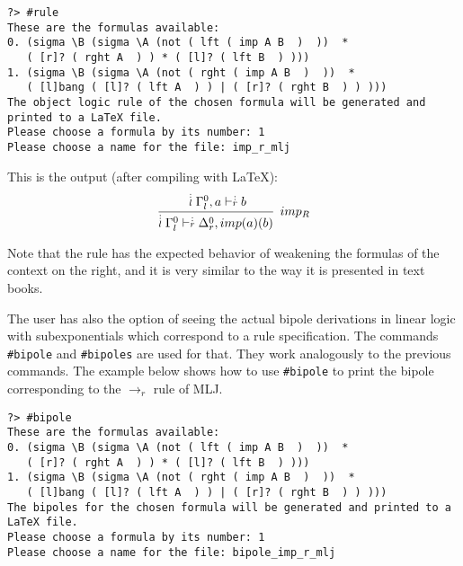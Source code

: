 \documentclass{llncs}
\newcommand{\ndots}[1]{\stackrel{\vcenter{\hbox{$\scriptstyle :$}\vskip-.35ex}}
   {\hbox {$ \scriptstyle {#1}$}}}
\begin{document}
{\scriptsize
\begin{verbatim}
?> #rule
These are the formulas available: 
0. (sigma \B (sigma \A (not ( lft ( imp A B  )  ))  * 
   ( [r]? ( rght A  ) ) * ( [l]? ( lft B  ) )))
1. (sigma \B (sigma \A (not ( rght ( imp A B  )  ))  * 
   ( [l]bang ( [l]? ( lft A  ) ) | ( [r]? ( rght B  ) ) )))
The object logic rule of the chosen formula will be generated and printed to a LaTeX file.
Please choose a formula by its number: 1
Please choose a name for the file: imp_r_mlj
\end{verbatim}
}

This is the output (after compiling with \LaTeX):
%
{\scriptsize
\[
\cfrac{ \ndots{l} \Gamma_{l}^{0}, a \vdash  \ndots{r} b}
{ \ndots{l} \Gamma_{l}^{0} \vdash  \ndots{r} \Delta_{r}^{0}, imp (a) (b) } \;\; imp_{R}
\]
}

Note that the rule has the expected behavior of weakening the formulas of the
context on the right, and it is very similar to the way it is presented in text
books.

The user has also the option of seeing the actual bipole derivations in linear
logic with subexponentials which correspond to a rule specification. The
commands \texttt{\#bipole} and \texttt{\#bipoles} are used for that. They work
analogously to the previous commands. The example below shows how to use
\texttt{\#bipole} to print the bipole corresponding to the $\rightarrow_r$ rule
of MLJ.
\vspace{-1mm}

{\scriptsize
\begin{verbatim}
?> #bipole 
These are the formulas available: 
0. (sigma \B (sigma \A (not ( lft ( imp A B  )  ))  * 
   ( [r]? ( rght A  ) ) * ( [l]? ( lft B  ) )))
1. (sigma \B (sigma \A (not ( rght ( imp A B  )  ))  * 
   ( [l]bang ( [l]? ( lft A  ) ) | ( [r]? ( rght B  ) ) )))
The bipoles for the chosen formula will be generated and printed to a LaTeX file.
Please choose a formula by its number: 1
Please choose a name for the file: bipole_imp_r_mlj
\end{verbatim}
}
\end{document}
